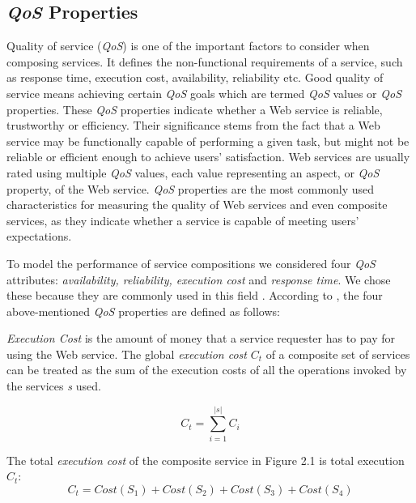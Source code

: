 \subsection{\emph{QoS} Properties}
Quality of service (\emph{QoS}) is one of the important factors to consider when composing services. It defines the non-functional requirements of a service, such as response time, execution cost, availability, reliability etc. Good quality of service means achieving certain \emph{QoS} goals which are termed \emph{QoS} values or \emph{QoS} properties. These \emph{QoS} properties indicate whether a Web service is reliable, trustworthy or efficiency. Their significance stems from the fact that a Web service may be functionally capable of performing a given task, but might not be reliable or efficient enough to achieve users' satisfaction. Web services are usually rated using multiple \emph{QoS} values, each value representing an aspect, or \emph{QoS} property, of the Web service. \emph{QoS} properties are the most commonly used characteristics for measuring the quality of Web services and even composite services, as they indicate whether a service is capable of meeting users' expectations.\par

To model the performance of service compositions we considered four \emph{QoS} attributes: \emph{availability, reliability, execution cost} and \emph{response time}. We chose these because they are commonly used in this field \cite{15,14,16,4}. According to \cite{11,4,18}, the four above-mentioned \emph{QoS} properties are defined as follows:\par

\emph{Execution Cost} is the amount of money that a service requester has to pay for using the Web service. The global \emph{execution cost} \emph{$C_t$} of a composite set of services can be treated as the sum of the execution costs of all the operations invoked by the services \emph{s} used. 

$$C_t = \sum_{i=1}^{|s|} C_i$$

\begin{example}
\noindent
The total \emph{execution cost} of the composite service in Figure 2.1 is total execution \emph{$C_t$}:
\begin{equation}
 C_t = Cost(S_1) + Cost(S_2) + Cost(S_3) + Cost(S_4)
 \end{equation}

\end{example}
\setlength{\textfloatsep}{20pt}%

